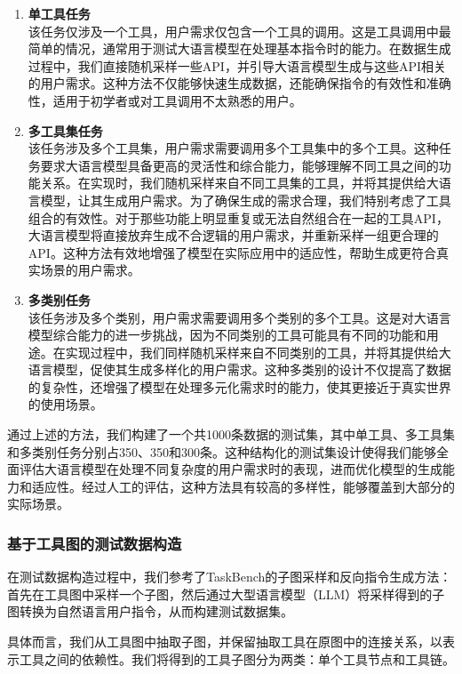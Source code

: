 \begin{enumerate}
  \item \textbf{单工具任务} \\
    该任务仅涉及一个工具，用户需求仅包含一个工具的调用。这是工具调用中最简单的情况，通常用于测试大语言模型在处理基本指令时的能力。在数据生成过程中，我们直接随机采样一些API，并引导大语言模型生成与这些API相关的用户需求。这种方法不仅能够快速生成数据，还能确保指令的有效性和准确性，适用于初学者或对工具调用不太熟悉的用户。

  \item \textbf{多工具集任务} \\
    该任务涉及多个工具集，用户需求需要调用多个工具集中的多个工具。这种任务要求大语言模型具备更高的灵活性和综合能力，能够理解不同工具之间的功能关系。在实现时，我们随机采样来自不同工具集的工具，并将其提供给大语言模型，让其生成用户需求。为了确保生成的需求合理，我们特别考虑了工具组合的有效性。对于那些功能上明显重复或无法自然组合在一起的工具API，大语言模型将直接放弃生成不合逻辑的用户需求，并重新采样一组更合理的API。这种方法有效地增强了模型在实际应用中的适应性，帮助生成更符合真实场景的用户需求。

  \item \textbf{多类别任务} \\
    该任务涉及多个类别，用户需求需要调用多个类别的多个工具。这是对大语言模型综合能力的进一步挑战，因为不同类别的工具可能具有不同的功能和用途。在实现过程中，我们同样随机采样来自不同类别的工具，并将其提供给大语言模型，促使其生成多样化的用户需求。这种多类别的设计不仅提高了数据的复杂性，还增强了模型在处理多元化需求时的能力，使其更接近于真实世界的使用场景。

\end{enumerate}

通过上述的方法，我们构建了一个共1000条数据的测试集，其中单工具、多工具集和多类别任务分别占350、350和300条。这种结构化的测试集设计使得我们能够全面评估大语言模型在处理不同复杂度的用户需求时的表现，进而优化模型的生成能力和适应性。经过人工的评估，这种方法具有较高的多样性，能够覆盖到大部分的实际场景。

\subsubsection{基于工具图的测试数据构造}

在测试数据构造过程中，我们参考了TaskBench的子图采样和反向指令生成方法：首先在工具图中采样一个子图，然后通过大型语言模型（LLM）将采样得到的子图转换为自然语言用户指令，从而构建测试数据集。

具体而言，我们从工具图中抽取子图，并保留抽取工具在原图中的连接关系，以表示工具之间的依赖性。我们将得到的工具子图分为两类：单个工具节点和工具链。

